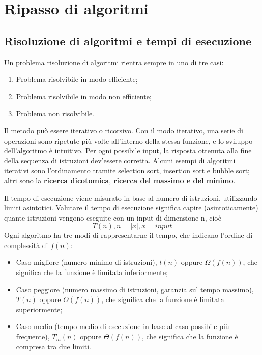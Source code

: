 \section{Ripasso di algoritmi}

\subsection{Risoluzione di algoritmi e tempi di esecuzione}
Un problema risoluzione di algoritmi rientra sempre in uno di tre casi:
\begin{enumerate}
	\item Problema risolvibile in modo efficiente;
	\item Problema risolvibile in modo non efficiente;
	\item Problema non risolvibile.
\end{enumerate}
Il metodo può essere iterativo o ricorsivo. Con il modo iterativo, una serie di operazioni sono ripetute più volte all'interno della stessa funzione, e lo sviluppo dell'algoritmo è intuitivo. Per ogni possibile input, la risposta ottenuta alla fine della sequenza di istruzioni dev'essere corretta. Alcuni esempi di algoritmi iterativi sono l'ordinamento tramite selection sort, insertion sort e bubble sort; altri sono la \textbf{ricerca dicotomica}, \textbf{ricerca del massimo e del minimo}.
\par Il tempo di esecuzione viene misurato in base al numero di istruzioni, utilizzando limiti asintotici. Valutare il tempo di esecuzione significa capire (asintoticamente) quante istruzioni vengono eseguite con un input di dimensione n, cioè 
$$T(n), n = |x|, x = input$$ 
Ogni algoritmo ha tre modi di rappresentarne il tempo, che indicano l'ordine di complessità di $f(n)$:
\begin{itemize}
	\item Caso migliore (numero minimo di istruzioni), $t(n)$ oppure $\Omega(f(n))$, che significa che la funzione è limitata inferiormente;
	\item Caso peggiore (numero massimo di istruzioni, garanzia sul tempo massimo), $T(n)$ oppure $O(f(n))$, che significa che la funzione è limitata superiormente;
	\item Caso medio (tempo medio di esecuzione in base al caso possibile più frequente), $T_m(n)$ oppure $\Theta(f(n))$, che significa che la funzione è compresa tra due limiti.
\end{itemize}


